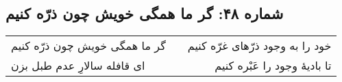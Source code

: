 \begin{center}
\section*{شماره ۴۸: گر ما همگی خویش چون  ذرّه کنیم}
\label{sec:048}
\begin{longtable}{l p{0.5cm} r}
گر ما همگی خویش چون ذرّه کنیم
&&
خود را به وجود ذرّهای غرّه کنیم
\\
ای قافله سالارِ عدم طبل بزن
&&
تا بادیهٔ وجود را عَبْره کنیم
\\
\end{longtable}
\end{center}
